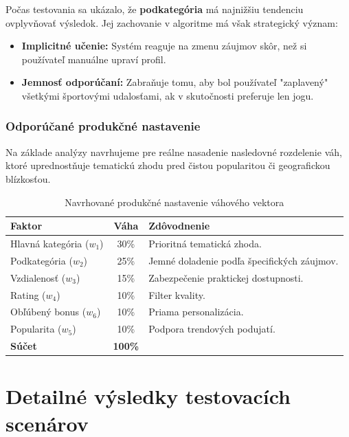\documentclass[12pt,a4paper]{article}
\begin{document}
Počas testovania sa ukázalo, že \textbf{podkategória} má najnižšiu tendenciu ovplyvňovať výsledok. Jej zachovanie v algoritme má však strategický význam:
\begin{itemize}
    \item \textbf{Implicitné učenie:} Systém reaguje na zmenu záujmov skôr, než si používateľ manuálne upraví profil.
    \item \textbf{Jemnosť odporúčaní:} Zabraňuje tomu, aby bol používateľ "zaplavený" všetkými športovými udalosťami, ak v skutočnosti preferuje len jogu.
\end{itemize}

\subsubsection{Odporúčané produkčné nastavenie}

Na základe analýzy navrhujeme pre reálne nasadenie nasledovné rozdelenie váh, ktoré uprednostňuje tematickú zhodu pred čistou popularitou či geografickou blízkosťou.

\begin{table}[H]
\centering
\begin{tabular}{|l|c|l|}
\hline
\textbf{Faktor} & \textbf{Váha} & \textbf{Zdôvodnenie} \\
\hline
Hlavná kategória ($w_1$) & 30\% & Prioritná tematická zhoda. \\
Podkategória ($w_2$) & 25\% & Jemné doladenie podľa špecifických záujmov. \\
Vzdialenosť ($w_3$) & 15\% & Zabezpečenie praktickej dostupnosti. \\
Rating ($w_4$) & 10\% & Filter kvality. \\
Obľúbený bonus ($w_6$) & 10\% & Priama personalizácia. \\
Popularita ($w_5$) & 10\% & Podpora trendových podujatí. \\
\hline
\textbf{Súčet} & \textbf{100\%} & \\
\hline
\end{tabular}
\caption{Navrhované produkčné nastavenie váhového vektora}
\label{tab:produkcia}
\end{table}


\newpage
\appendix
\section{Detailné výsledky testovacích scenárov}

\end{document}
